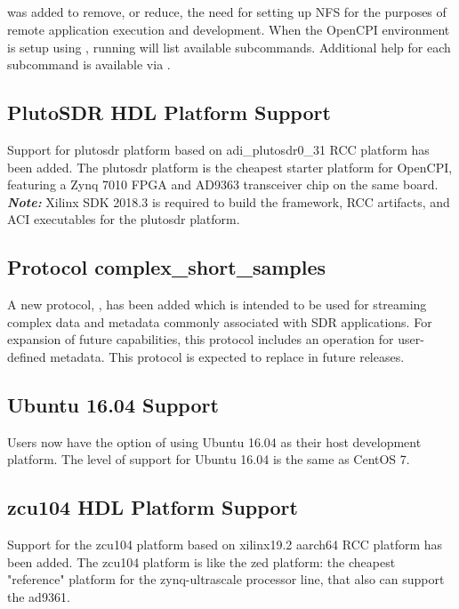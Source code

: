 \subsection{}
\label{sec:17_ocpiremote}
 was added to remove, or reduce, the need for setting up NFS for the purposes of remote application execution and development. When the OpenCPI environment is setup using , running  will list available subcommands. Additional help for each subcommand is available via .

\subsection{PlutoSDR HDL Platform Support}
\label{sec:17_plutosdr}
Support for plutosdr platform based on adi\_{}plutosdr0\_{}31 RCC platform has been added. The plutosdr platform is the cheapest starter platform for OpenCPI, featuring a Zynq 7010 FPGA and AD9363 transceiver chip on the same board.\\

\textit{\textbf{Note:}} Xilinx SDK 2018.3 is required to build the framework, RCC artifacts, and ACI executables for the plutosdr platform.

\subsection{Protocol complex\_{}short\_{}samples}
\label{sec:17_css}
A new protocol, , has been added which is intended to be used for streaming complex data and metadata commonly associated with SDR applications. For expansion of future capabilities, this protocol includes an operation for user-defined metadata. This protocol is expected to replace  in future releases.

\subsection{Ubuntu 16.04 Support}
\label{sec:17_ubuntu_16.04}
Users now have the option of using Ubuntu 16.04 as their host development platform. The level of support for Ubuntu 16.04 is the same as CentOS 7.

\subsection{zcu104 HDL Platform Support}
\label{sec:17_zcu104}
Support for the zcu104 platform based on xilinx19.2 aarch64 RCC platform has been added. The zcu104 platform is like the zed platform: the cheapest "reference" platform for the zynq-ultrascale processor line, that
also can support the ad9361.\\

